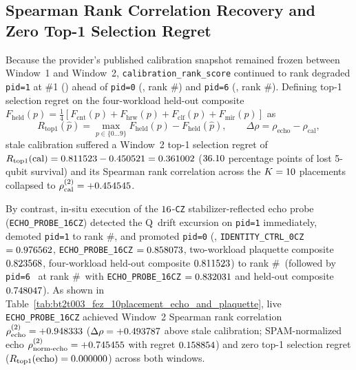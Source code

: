 \documentclass[aps,prx,twocolumn,superscriptaddress,nofootinbib]{revtex4-2}
\begin{document}
\subsection{Spearman Rank Correlation Recovery and Zero Top-1 Selection Regret}

Because the provider's published calibration snapshot remained frozen between Window~1 and Window~2, \texttt{calibration\_rank\_score} continued to rank degraded \texttt{pid=1} at \#1 (\BTPlaqPidOneCalScore) ahead of \texttt{pid=0} (\BTPlaqPidZeroCalScore, rank \#\BTPlaqPidZeroCalRank) and \texttt{pid=6} (\BTPlaqPidSixCalScore, rank \#\BTPlaqPidSixCalRank). Defining top-1 selection regret on the four-workload held-out composite $F_{\mathrm{held}}(p) = \tfrac{1}{4}[F_{\mathrm{cnt}}(p) + F_{\mathrm{hrw}}(p) + F_{\mathrm{clf}}(p) + F_{\mathrm{mir}}(p)]$ as
\begin{equation}
\label{eq:top1_regret_and_spearman}
R_{\mathrm{top1}}(\hat{p}) = \max_{p \in \{0\dots 9\}} F_{\mathrm{held}}(p) - F_{\mathrm{held}}(\hat{p}), \qquad \Delta\rho = \rho_{\mathrm{echo}} - \rho_{\mathrm{cal}},
\end{equation}
stale calibration suffered a Window~2 top-1 selection regret of $R_{\mathrm{top1}}(\mathrm{cal}) = 0.811523 - 0.450521 = 0.361002$ ($36.10$ percentage points of lost 5-qubit survival) and its Spearman rank correlation across the $K = 10$ placements collapsed to $\rho_{\mathrm{cal}}^{(2)} = +0.454545$.

By contrast, in-situ execution of the $16$-\texttt{CZ} stabilizer-reflected echo probe (\texttt{ECHO\_PROBE\_16CZ}) detected the Q\BTPlaqDriftedHubQubit\ drift excursion on \texttt{pid=1} immediately, demoted \texttt{pid=1} to rank \#\BTPlaqPidOneEchoRank, and promoted \texttt{pid=0} (\BTPlaqPidZeroQubits, \texttt{IDENTITY\_CTRL\_0CZ} $= 0.976562$, \texttt{ECHO\_PROBE\_16CZ} $= 0.858073$, two-workload plaquette composite $0.823568$, four-workload held-out composite $0.811523$) to rank \#\BTPlaqPidZeroEchoRank\ (followed by \texttt{pid=6} \BTPlaqPidSixQubits\ at rank \#\BTPlaqPidSixEchoRank\ with \texttt{ECHO\_PROBE\_16CZ} $= 0.832031$ and held-out composite $0.748047$). As shown in Table~\ref{tab:bt2t003_fez_10placement_echo_and_plaquette}, live \texttt{ECHO\_PROBE\_16CZ} achieved Window~2 Spearman rank correlation $\rho_{\mathrm{echo}}^{(2)} = +0.948333$ ($\Delta\rho = +0.493787$ above stale calibration; SPAM-normalized echo $\rho_{\mathrm{norm\text{-}echo}}^{(2)} = +0.745455$ with regret $0.158854$) and zero top-1 selection regret ($R_{\mathrm{top1}}(\mathrm{echo}) = 0.000000$) across both windows.
\end{document}
